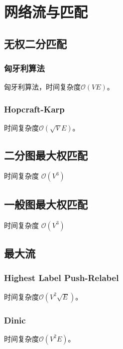 \section{网络流与匹配}

\subsection{无权二分匹配}

\subsubsection{匈牙利算法}

匈牙利算法，时间复杂度$\mathcal{O}(VE)$。


\subsubsection{Hopcraft-Karp}

时间复杂度$\mathcal{O}(\sqrt{V}E)$。


\subsection{二分图最大权匹配}

时间复杂度 $\mathcal{O}(V^3)$



\subsection{一般图最大权匹配}

时间复杂度 $\mathcal{O}(V^3)$



\subsection{最大流}

\subsubsection{Highest Label Push-Relabel}
时间复杂度$\mathcal{O}(V^2 \sqrt{E})$。


\subsubsection{Dinic}
时间复杂度$\mathcal{O}(V^2E)$。


